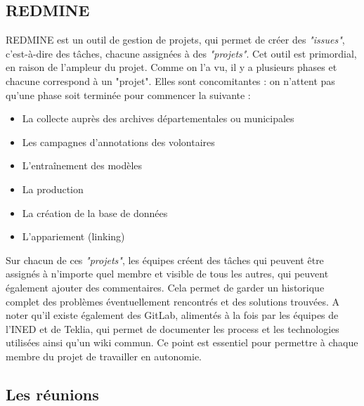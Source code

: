             \subsection{REDMINE}

REDMINE est un outil de gestion de projets, qui permet de créer des \textit{"issues"}, c’est-à-dire des tâches, chacune assignées à des \textit{"projets"}. Cet outil est primordial, en raison de l’ampleur du projet. Comme on l’a vu, il y a plusieurs phases et chacune correspond à un "projet". Elles sont concomitantes : on n'attent pas qu’une phase soit terminée pour commencer la suivante :

\begin{itemize}[label=\textbullet] %
    \item La collecte auprès des archives départementales ou municipales 
    \item Les campagnes d’annotations des volontaires
    \item L’entraînement des modèles 
    \item La production 
    \item La création de la base de données 
    \item L'appariement (linking)
\end{itemize}

Sur chacun de ces \textit{"projets"}, les équipes créent des tâches qui peuvent être assignés à n’importe quel membre et visible de tous les autres, qui peuvent également ajouter des commentaires. Cela permet de garder un historique complet des problèmes éventuellement rencontrés et des solutions trouvées. 
A noter qu’il existe également des GitLab, alimentés à la fois par les équipes de l’INED et de Teklia, qui permet de documenter les process et les technologies utilisées ainsi qu'un wiki commun. Ce point est essentiel pour permettre à chaque membre du projet de travailler en autonomie.

        \subsection{Les réunions}

